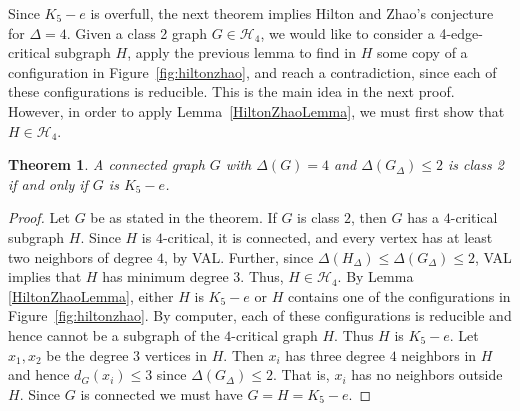 \documentclass[12pt]{article}
\theoremstyle{plain}
\newtheorem{thm}{Theorem}[section]
\theoremstyle{definition}
\theoremstyle{remark}
\newcommand{\fancy}[1]{\mathcal{#1}}
\newcommand{\size}[1]{\left\Vert#1\right\Vert}
\def\H{\fancy{H}}
\begin{document}
Since $K_5 - e$ is overfull, the next theorem implies Hilton and Zhao's conjecture
for $\Delta=4$.  Given a class 2 graph $G\in \H_4$, we would like to consider a
4-edge-critical subgraph $H$, apply the previous lemma to find in $H$ some copy of a
configuration in Figure~\ref{fig:hiltonzhao}, and reach a contradiction, since
each of these configurations is reducible.  This is the main idea in the next
proof.  However, in order to apply Lemma~\ref{HiltonZhaoLemma}, we must first
show that $H\in \H_4$.

\begin{thm}
A connected graph $G$ with $\Delta(G) = 4$ and $\Delta(G_\Delta) \le 2$ is
class 2 if and only if $G$ is $K_5-e$.
\end{thm}
%
%
%

\begin{proof} %
Let $G$ be as stated in the theorem.
If $G$ is class $2$, then $G$ has a $4$-critical subgraph $H$.   Since
$H$ is $4$-critical, it is connected, 
and every vertex has at least two neighbors of degree $4$, by VAL.  
Further, since $\Delta(H_\Delta) \le \Delta(G_\Delta) \le 2$, VAL implies
that $H$ has minimum degree $3$. 
Thus, $H \in \H_4$.  By Lemma \ref{HiltonZhaoLemma}, 
either $H$ is $K_5-e$ or $H$ contains one of
the configurations in Figure~\ref{fig:hiltonzhao}.  By computer, each of these
configurations is reducible and hence cannot be a subgraph of the $4$-critical
graph $H$.  Thus $H$ is $K_5-e$.  Let $x_1,x_2$ be the degree $3$ vertices in
$H$.  Then $x_i$ has three degree $4$ neighbors in $H$ and hence $d_G(x_i) \le
3$ since $\Delta(G_\Delta) \le 2$.  That is, $x_i$ has no neighbors outside
$H$.  Since $G$ is connected we must have $G = H = K_5 - e$. 
\end{proof}
\end{document}
